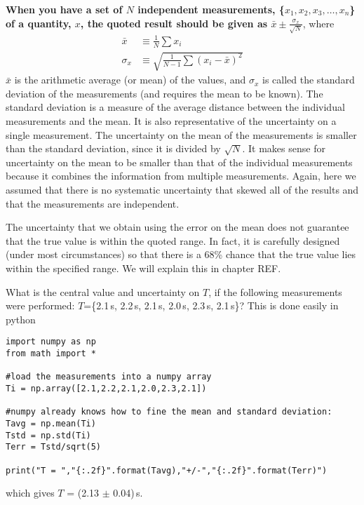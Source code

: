 \textbf{When you have a set of $N$ independent measurements, \{$x_1, x_2, x_3, \dots, x_n$\} of a quantity, $x$, the quoted result should be given as $\bar x \pm \frac{\sigma_x}{\sqrt{N}}$}, where
\begin{align}
\label{eqn:MeanAndStd}
\bar x &\equiv \frac{1}{N}\sum x_i \nonumber\\
\sigma_x &\equiv \sqrt{\frac{1}{N-1}\sum (x_i-\bar x)^2}
\end{align}
$\bar x$ is the arithmetic average (or mean) of the values, and $\sigma_x$ is called the standard deviation of the measurements (and requires the mean to be known). The standard deviation is a measure of the average distance between the individual measurements and the mean. It is also representative of the uncertainty on a single measurement. The uncertainty on the mean of the measurements is smaller than the standard deviation, since it is divided by $\sqrt{N}$. It makes sense for uncertainty on the mean to be smaller than that of the individual measurements because it combines the information from multiple measurements. Again, here we assumed that there is no systematic uncertainty that skewed all of the results and that the measurements are independent.

The uncertainty that we obtain using the error on the mean does not guarantee that the true value is within the quoted range. In fact, it is carefully designed (under most circumstances) so that there is a 68\% chance that the true value lies within the specified range. We will explain this in chapter REF.

\begin{example}{0pt}{What is the central value and uncertainty on $T$, if the following measurements were performed: $T$=\{2.1\,s, 2.2\,s, 2.1\,s, 2.0\,s, 2.3\,s, 2.1\,s\}?}{}
\label{ex:ChapUncertainties_mean}
This is done easily in python
\begin{lstlisting}[frame=single] 
import numpy as np
from math import *

#load the measurements into a numpy array
Ti = np.array([2.1,2.2,2.1,2.0,2.3,2.1])

#numpy already knows how to fine the mean and standard deviation:
Tavg = np.mean(Ti)
Tstd = np.std(Ti)
Terr = Tstd/sqrt(5)

print("T = ","{:.2f}".format(Tavg),"+/-","{:.2f}".format(Terr)")
\end{lstlisting}
which gives $T$ = (2.13 $\pm$ 0.04)\,s.
\end{example}


